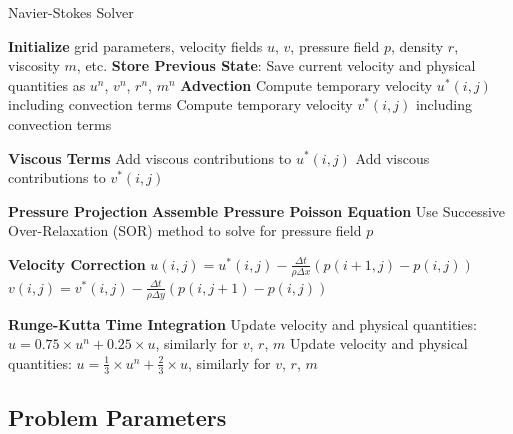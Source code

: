 \documentclass[12pt]{article}
\begin{document}
\begin{algorithm}[H]
\tiny
\caption{Navier-Stokes Solver}
\begin{algorithmic}[1]
\STATE \textbf{Initialize} grid parameters, velocity fields $u$, $v$, pressure field $p$, density $r$, viscosity $m$, etc.
    \STATE \textbf{Store Previous State}: Save current velocity and physical quantities as $u^n$, $v^n$, $r^n$, $m^n$
        \STATE \textbf{Advection}
            \STATE Compute temporary velocity $u^*(i,j)$ including convection terms
        \ENDFOR
            \STATE Compute temporary velocity $v^*(i,j)$ including convection terms
        \ENDFOR
        
        \STATE \textbf{Viscous Terms}
            \STATE Add viscous contributions to $u^*(i,j)$
        \ENDFOR
            \STATE Add viscous contributions to $v^*(i,j)$
        \ENDFOR
        
        \STATE \textbf{Pressure Projection}
        \STATE \textbf{Assemble Pressure Poisson Equation}
        \STATE Use Successive Over-Relaxation (SOR) method to solve for pressure field $p$
        
        \STATE \textbf{Velocity Correction}
            \STATE $u(i,j) = u^*(i,j) - \frac{\Delta t}{\rho \Delta x}(p(i+1,j) - p(i,j))$
        \ENDFOR
            \STATE $v(i,j) = v^*(i,j) - \frac{\Delta t}{\rho \Delta y}(p(i,j+1) - p(i,j))$
        \ENDFOR
        
        \STATE \textbf{Runge-Kutta Time Integration}
            \STATE Update velocity and physical quantities: $u = 0.75 \times u^n + 0.25 \times u$, similarly for $v$, $r$, $m$
            \STATE Update velocity and physical quantities: $u = \frac{1}{3} \times u^n + \frac{2}{3} \times u$, similarly for $v$, $r$, $m$
        \ENDIF
    \ENDFOR
\ENDFOR
\end{algorithmic}
\end{algorithm}




\subsection{Problem Parameters}
\end{document}
